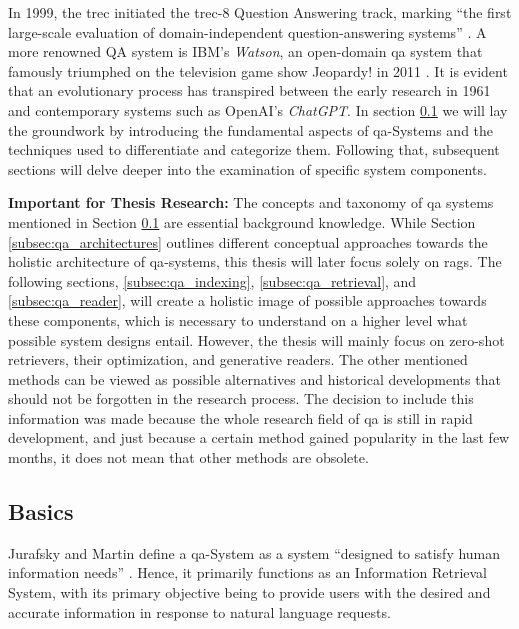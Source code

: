 In 1999, the \gls{trec} initiated the \gls{trec}-8 Question Answering track, marking \enquote{the first large-scale evaluation of domain-independent question-answering systems} \cite{voorhees_trec-8_1999}. A more renowned QA system is IBM's \textit{Watson}, an open-domain \gls{qa} system that famously triumphed on the television game show Jeopardy! in 2011 \cite{ferrucci_introduction_2012}. It is evident that an evolutionary process has transpired between the early research in 1961 and contemporary systems such as OpenAI's \textit{ChatGPT}. In section \ref{subsec:qa_basics} we will lay the groundwork by introducing the fundamental aspects of \gls{qa}-Systems and the techniques used to differentiate and categorize them. Following that, subsequent sections will delve deeper into the examination of specific system components.

\textbf{Important for Thesis Research:} The concepts and taxonomy of \gls{qa} systems mentioned in Section \ref{subsec:qa_basics} are essential background knowledge. While Section \ref{subsec:qa_architectures} outlines different conceptual approaches towards the holistic architecture of \gls{qa}-systems, this thesis will later focus solely on \gls{rag}s. The following sections, \ref{subsec:qa_indexing}, \ref{subsec:qa_retrieval}, and \ref{subsec:qa_reader}, will create a holistic image of possible approaches towards these components, which is necessary to understand on a higher level what possible system designs entail. However, the thesis will mainly focus on zero-shot retrievers, their optimization, and generative readers. The other mentioned methods can be viewed as possible alternatives and historical developments that should not be forgotten in the research process. The decision to include this information was made because the whole research field of \gls{qa} is still in rapid development, and just because a certain method gained popularity in the last few months, it does not mean that other methods are obsolete.


\subsection{Basics}
\label{subsec:qa_basics}

Jurafsky and Martin define a \gls{qa}-System as a system \enquote{designed to satisfy human information needs} \cite{jurafsky_speech_2023}. Hence, it primarily functions as an Information Retrieval System, with its primary objective being to provide users with the desired and accurate information in response to natural language requests.

